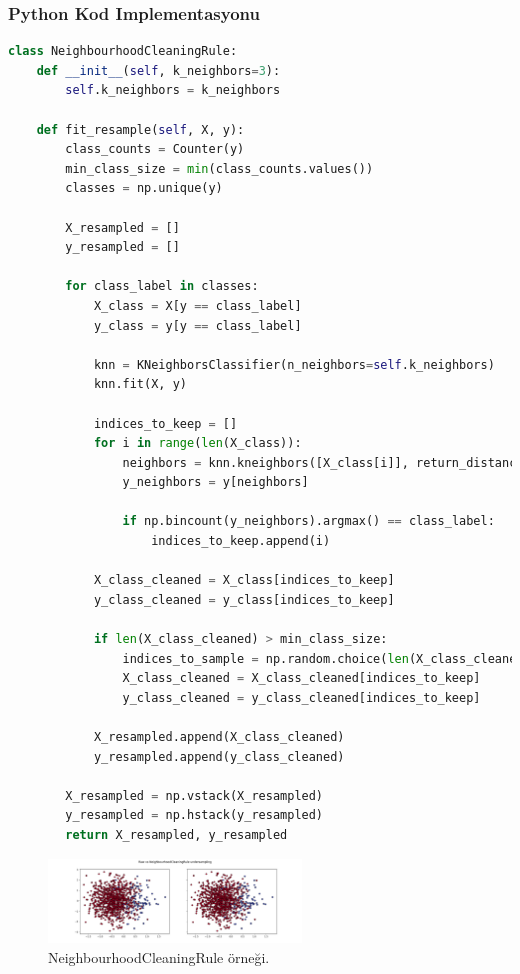 \subsubsection{Python Kod Implementasyonu}

\begin{lstlisting}[language=Python]
class NeighbourhoodCleaningRule:
    def __init__(self, k_neighbors=3):
        self.k_neighbors = k_neighbors

    def fit_resample(self, X, y):
        class_counts = Counter(y)
        min_class_size = min(class_counts.values())
        classes = np.unique(y)

        X_resampled = []
        y_resampled = []

        for class_label in classes:
            X_class = X[y == class_label]
            y_class = y[y == class_label]

            knn = KNeighborsClassifier(n_neighbors=self.k_neighbors)
            knn.fit(X, y)

            indices_to_keep = []
            for i in range(len(X_class)):
                neighbors = knn.kneighbors([X_class[i]], return_distance=False)[0]
                y_neighbors = y[neighbors]

                if np.bincount(y_neighbors).argmax() == class_label:
                    indices_to_keep.append(i)

            X_class_cleaned = X_class[indices_to_keep]
            y_class_cleaned = y_class[indices_to_keep]

            if len(X_class_cleaned) > min_class_size:
                indices_to_sample = np.random.choice(len(X_class_cleaned), min_class_size, replace=False)
                X_class_cleaned = X_class_cleaned[indices_to_keep]
                y_class_cleaned = y_class_cleaned[indices_to_keep]

            X_resampled.append(X_class_cleaned)
            y_resampled.append(y_class_cleaned)

        X_resampled = np.vstack(X_resampled)
        y_resampled = np.hstack(y_resampled)
        return X_resampled, y_resampled
\end{lstlisting}

\begin{figure}[h]
    \centering
    \includegraphics[width=0.6\textwidth]{images/Raw vs NeighbourhoodCleaningRule undersampling.png}
    \caption{NeighbourhoodCleaningRule örneği.}
    \label{fig:enter-label}
\end{figure}

